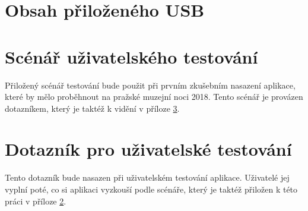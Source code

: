 \documentclass[thesis=B,czech]{FITthesis}[2012/06/26]
\begin{document}
\chapter{Obsah přiloženého USB}


\begin{figure}
\end{figure}

\chapter{Scénář uživatelského testování} \label{sec:scenar}
Přiložený scénář testování bude použit při prvním zkušebním nasazení aplikace, které by mělo proběhnout na pražské muzejní noci 2018. Tento scénář je provázen dotazníkem, který je taktéž k vidění v příloze \ref{sec:dotaznik}.

\chapter{Dotazník pro uživatelské testování} \label{sec:dotaznik}
Tento dotazník bude nasazen při uživatelském testování aplikace. Uživatelé jej vyplní poté, co si aplikaci vyzkouší podle scénáře, který je taktéž přiložen k této práci v příloze \ref{sec:scenar}.


  
\end{document}
